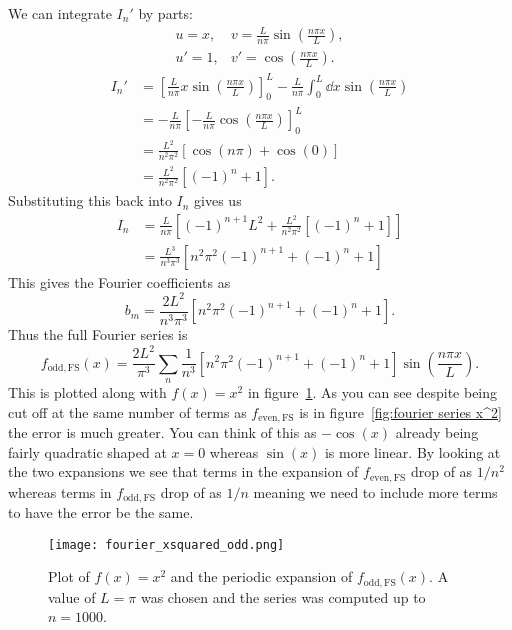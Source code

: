 \documentclass[a4paper]{article}
\newcommand{\FS}{{\mathrm{FS}}}
\begin{document}
    We can integrate \(I_n'\) by parts:
    \[
        \begin{array}{ll}
            u = x,  & v = \frac{L}{n\pi}\sin\left(\frac{n\pi x}{L}\right),\\[0.5em]
            u' = 1, & v' = \cos\left(\frac{n\pi x}{L}\right).
        \end{array}
    \]
    \begin{align*}
        I_n' &= \left[\frac{L}{n\pi}x\sin\left(\frac{n\pi x}{L}\right)\right]_0^L - \frac{L}{n\pi}\int_0^L \dd{x} \sin\left(\frac{n\pi x}{L}\right)\\
        &= -\frac{L}{n\pi}\left[-\frac{L}{n\pi}\cos\left(\frac{n\pi x}{L}\right)\right]_0^L\\
        &= \frac{L^2}{n^2\pi^2}[\cos(n\pi) + \cos(0)]\\
        &= \frac{L^2}{n^2\pi^2}[(-1)^n + 1].
    \end{align*}
    Substituting this back into \(I_n\) gives us
    \begin{align*}
        I_n &= \frac{L}{n\pi}\left[(-1)^{n+1}L^2 + \frac{L^2}{n^2\pi^2}[(-1)^n + 1]\right]\\
        &= \frac{L^3}{n^3\pi^3}[n^2\pi^2(-1)^{n+1} + (-1)^n + 1]
    \end{align*}
    This gives the Fourier coefficients as
    \[b_m = \frac{2L^2}{n^3\pi^3}[n^2\pi^2(-1)^{n+1} + (-1)^n + 1].\]
    Thus the full Fourier series is
    \[f_{\text{odd},\FS}(x) = \frac{2L^2}{\pi^3}\sum_n \frac{1}{n^3}[n^2\pi^2(-1)^{n+1} + (-1)^n + 1]\sin\left(\frac{n\pi x}{L}\right).\]
    This is plotted along with \(f(x) = x^2\) in figure~\ref{fig:odd extension of x^2}.
    As you can see despite being cut off at the same number of terms as \(f_{\text{even}, \FS}\) is in figure~\ref{fig:fourier series x^2} the error is much greater.
    You can think of this as \(-\cos(x)\) already being fairly quadratic shaped at \(x = 0\) whereas \(\sin(x)\) is more linear.
    By looking at the two expansions we see that terms in the expansion of \(f_{\text{even}, \FS}\) drop of as \(1/n^2\) whereas terms in \(f_{\text{odd}, \FS}\) drop of as \(1/n\) meaning we need to include more terms to have the error be the same.
    \begin{figure}[ht]
        \centering
        \texttt{[image: fourier\_xsquared\_odd.png]}
        \caption{Plot of \(f(x) = x^2\) and the periodic expansion of \(f_{\text{odd},\FS}(x)\). A value of \(L = \pi\) was chosen and the series was computed up to \(n = 1000\).}
        \label{fig:odd extension of x^2}
    \end{figure}
\end{document}
